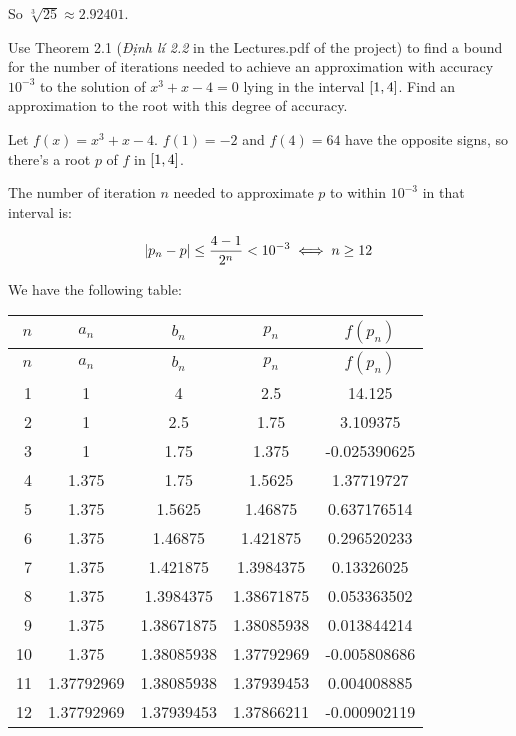 \documentclass[../../Assignments.tex]{subfiles}
\begin{document}
\begin{solution}
    So \(\sqrt[3]{25} \approx \num{2.92401}\).
\end{solution}

\begin{exercise}
    Use Theorem 2.1 (\emph{Định lí 2.2} in the Lectures.pdf of the project) to
    find a bound for the number of iterations needed to achieve an approximation
    with accuracy \(10^{-3}\) to the solution of \(x^3 + x − 4 = 0\) lying in
    the interval \(\interval{1}{4}\). Find an approximation to the root with
    this degree of accuracy.
\end{exercise}

\begin{solution}
    Let \(f(x) = x^3 + x − 4\). \(f(1) = -2\) and \(f(4) = 64\) have the
    opposite signs, so there's a root \(p\) of \(f\) in \(\interval{1}{4}\).

    The number of iteration \(n\) needed to approximate \(p\) to within
    \(10^{-3}\) in that interval is:

    \[\abs{p_n - p} \leq \frac{4 - 1}{2^n} < 10^{-3} \iff n \geq 12\]

    We have the following table:

    \begin{longtable}{r S[table-format=1.8] S[table-format=1.8] S[table-format=1.8] S[table-format=-1.9]}
        \toprule
        \(n\)  &   {\(a_n\)}   &   {\(b_n\)}   &   {\(p_n\)}   &  {\(f(p_n)\)}  \\
        \midrule
        \endfirsthead
        \toprule
        \(n\)  &   {\(a_n\)}   &   {\(b_n\)}   &   {\(p_n\)}   &  {\(f(p_n)\)}  \\
        \midrule
          &  1            &  4            &  2.5          &  14.125        \\
            2  &  1            &  2.5          &  1.75         &   3.109375     \\
            3  &  1            &  1.75         &  1.375        &  -0.025390625  \\
            4  &  1.375        &  1.75         &  1.5625       &   1.37719727   \\
            5  &  1.375        &  1.5625       &  1.46875      &   0.637176514  \\
            6  &  1.375        &  1.46875      &  1.421875     &   0.296520233  \\
            7  &  1.375        &  1.421875     &  1.3984375    &   0.13326025   \\
            8  &  1.375        &  1.3984375    &  1.38671875   &   0.053363502  \\
            9  &  1.375        &  1.38671875   &  1.38085938   &   0.013844214  \\
           10  &  1.375        &  1.38085938   &  1.37792969   &  -0.005808686  \\
           11  &  1.37792969   &  1.38085938   &  1.37939453   &   0.004008885  \\
           12  &  1.37792969   &  1.37939453   &  1.37866211   &  -0.000902119  \\
        \bottomrule
    \end{longtable}


\end{solution}
\end{document}
